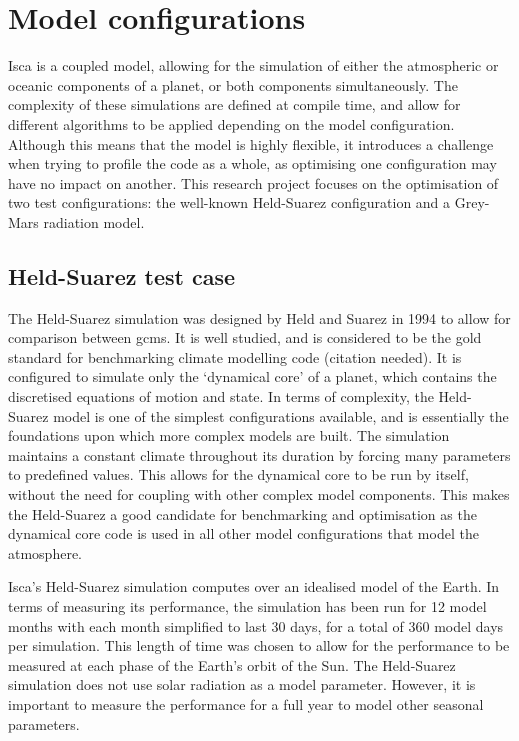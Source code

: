 \documentclass[a4paper,11pt]{report}
\begin{document}
\section{Model configurations}
Isca is a coupled model, allowing for the simulation of either the atmospheric or oceanic components of a planet, or both components simultaneously. The complexity of these simulations are defined at compile time, and allow for different algorithms to be applied depending on the model configuration. Although this means that the model is highly flexible, it introduces a challenge when trying to profile the code as a whole, as optimising one configuration may have no impact on another. This research project focuses on the optimisation of two test configurations: the well-known Held-Suarez configuration and a Grey-Mars radiation model.

\subsection{Held-Suarez test case}
The Held-Suarez simulation was designed by Held and Suarez in 1994 \cite{held1994proposal} to allow for comparison between \gls{gcm}s. It is well studied, and is considered to be the gold standard for benchmarking climate modelling code (citation needed). It is configured to simulate only the `dynamical core' of a planet, which contains the discretised equations of motion and state. In terms of complexity, the Held-Suarez model is one of the simplest configurations available, and is essentially the foundations upon which more complex models are built. The simulation maintains a constant climate throughout its duration by forcing many parameters to predefined values. This allows for the dynamical core to be run by itself, without the need for coupling with other complex model components. This makes the Held-Suarez a good candidate for benchmarking and optimisation as the dynamical core code is used in all other model configurations that model the atmosphere. 
\par
Isca's Held-Suarez simulation computes over an idealised model of the Earth. In terms of measuring its performance, the simulation has been run for 12 model months with each month simplified to last 30 days, for a total of 360 model days per simulation. This length of time was chosen to allow for the performance to be measured at each phase of the Earth's orbit of the Sun. The Held-Suarez simulation does not use solar radiation as a model parameter. However, it is important to measure the performance for a full year to model other seasonal parameters.
\end{document}
